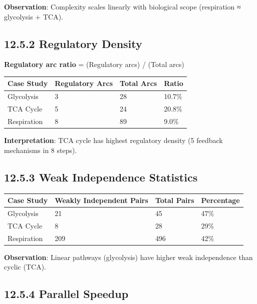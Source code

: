 \textbf{Observation}: Complexity scales linearly with biological scope
(respiration ≈ glycolysis + TCA).

\hypertarget{regulatory-density}{%
\subsection{12.5.2 Regulatory Density}\label{regulatory-density}}

\textbf{Regulatory arc ratio} = (Regulatory arcs) / (Total arcs)

\begin{longtable}[]{@{}llll@{}}
\toprule\noalign{}
Case Study & Regulatory Arcs & Total Arcs & Ratio \\
\midrule\noalign{}
\endhead
\bottomrule\noalign{}
\endlastfoot
Glycolysis & 3 & 28 & 10.7\% \\
TCA Cycle & 5 & 24 & 20.8\% \\
Respiration & 8 & 89 & 9.0\% \\
\end{longtable}

\textbf{Interpretation}: TCA cycle has highest regulatory density (5
feedback mechanisms in 8 steps).

\hypertarget{weak-independence-statistics}{%
\subsection{12.5.3 Weak Independence
Statistics}\label{weak-independence-statistics}}

\begin{longtable}[]{@{}llll@{}}
\toprule\noalign{}
Case Study & Weakly Independent Pairs & Total Pairs & Percentage \\
\midrule\noalign{}
\endhead
\bottomrule\noalign{}
\endlastfoot
Glycolysis & 21 & 45 & 47\% \\
TCA Cycle & 8 & 28 & 29\% \\
Respiration & 209 & 496 & 42\% \\
\end{longtable}

\textbf{Observation}: Linear pathways (glycolysis) have higher weak
independence than cyclic (TCA).

\hypertarget{parallel-speedup}{%
\subsection{12.5.4 Parallel Speedup}\label{parallel-speedup}}

